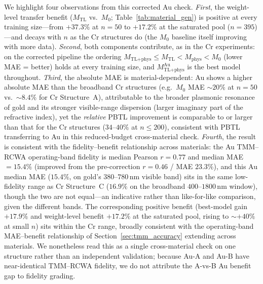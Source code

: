 \documentclass[a4paper,fleqn]{cas-sc}
\newcommand{\Mzero}{M_0}
\newcommand{\Mphys}{M_\text{phys}}
\newcommand{\Mtl}{M_\text{TL}}
\newcommand{\Mtlphys}{M_\text{TL+phys}}
\begin{document}
We highlight four observations from this corrected Au check. \emph{First}, the weight-level transfer benefit ($\Mtl$ vs.\ $\Mzero$; Table~\ref{tab:material_gen}) is positive at every training size---from $+37.3\%$ at $n=50$ to $+17.2\%$ at the saturated pool ($n=395$)---and decays with $n$ as the Cr structures do (the $\Mzero$ baseline itself improving with more data). \emph{Second}, both components contribute, as in the Cr experiments: on the corrected pipeline the ordering $\Mtlphys \leq \Mtl < \Mphys < \Mzero$ (lower MAE = better) holds at every training size, and $\Mtlphys^\text{Au}$ is the best model throughout. \emph{Third}, the absolute MAE is material-dependent: Au shows a higher absolute MAE than the broadband Cr structures (e.g.\ $\Mzero$ MAE ${\sim}20\%$ at $n=50$ vs.\ ${\sim}8.4\%$ for Cr Structure~A), attributable to the broader plasmonic resonance of gold and its stronger visible-range dispersion (larger imaginary part of the refractive index), yet the \emph{relative} PBTL improvement is comparable to or larger than that for the Cr structures ($34$--$40\%$ at $n \leq 200$), consistent with PBTL transferring to Au in this reduced-budget cross-material check. \emph{Fourth}, the result is consistent with the fidelity--benefit relationship across materials: the Au TMM--RCWA operating-band fidelity is median Pearson $r=0.77$ and median MAE $=15.4\%$ (improved from the pre-correction $r=0.46$ / MAE $23.3\%$), and this Au median MAE ($15.4\%$, on gold's $380$--$780$\,nm visible band) sits in the same low-fidelity range as Cr Structure~C ($16.9\%$ on the broadband $400$--$1800$\,nm window), though the two are not equal---an indicative rather than like-for-like comparison, given the different bands. The corresponding positive benefit (best-model gain $+17.9\%$ and weight-level benefit $+17.2\%$ at the saturated pool, rising to ${\sim}+40\%$ at small $n$) sits within the Cr range, broadly consistent with the operating-band MAE--benefit relationship of Section~\ref{sec:tmm_accuracy} extending across materials. We nonetheless read this as a single cross-material check on one structure rather than an independent validation; because Au-A and Au-B have near-identical TMM--RCWA fidelity, we do not attribute the A-vs-B Au benefit gap to fidelity grading.
\end{document}
